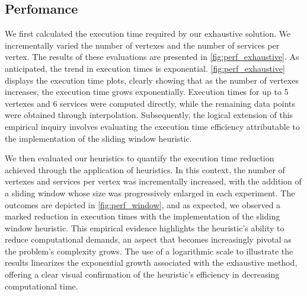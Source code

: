\subsection{Perfomance}\label{subsec:experiments_performance}
We first calculated the execution time required by our exhaustive solution.
We incrementally varied the number of vertexes and the number of services per vertex.
The results of these evaluations are presented in \cref{fig:perf_exhaustive}.
As anticipated, the trend in execution times is exponential. \cref{fig:perf_exhaustive} displays the execution time plots,
clearly showing that as the number of vertexes increases, the execution time grows exponentially.
Execution times for up to 5 vertexes and 6 services were computed directly,
while the remaining data points were obtained through interpolation.
Subsequently, the logical extension of this empirical inquiry involves evaluating the execution time efficiency attributable to the implementation of the sliding window heuristic.

We then evaluated our heuristics to quantify the execution time reduction achieved through the application of heuristics.
In this context, the number of vertexes and services per vertex was incrementally increased,
with the addition of a sliding window whose size was progressively enlarged in each experiment.
The outcomes are depicted in \cref{fig:perf_window}, and as expected,
we observed a marked reduction in execution times with the implementation of the sliding window heuristic.
This empirical evidence highlights the heuristic's ability to reduce computational demands,
an aspect that becomes increasingly pivotal as the problem's complexity grows.
The use of a logarithmic scale to illustrate the results linearizes the exponential growth associated with the exhaustive method,
offering a clear visual confirmation of the heuristic's efficiency in decreasing computational time.


